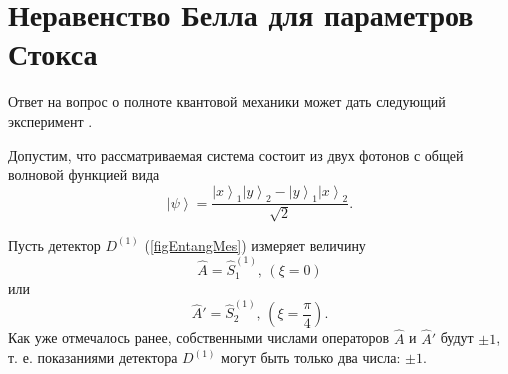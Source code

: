 \section{Неравенство Белла для параметров Стокса}
\label{pPart3EntangleBell}
Ответ на вопрос о полноте квантовой механики может дать следующий
эксперимент \cite{bBell, bPhisQuantInfo, PhysRevLett.28.938}.

Допустим, что рассматриваемая система состоит из двух фотонов с общей
волновой функцией вида
\begin{equation}
\left|\psi\right> = \frac{
\left|x\right>_1\left|y\right>_2 -
\left|y\right>_1\left|x\right>_2
}{\sqrt{2}}.
\label{eqBellInequalityState}
\end{equation}

Пусть детектор $D^{(1)}$ (\autoref{figEntangMes}) измеряет величину 
\[
\hat{A} = \hat{S}_1^{(1)}, \, (\xi = 0)
\] 
или
\[
\hat{A}' = \hat{S}_2^{(1)},\,(\xi =\frac{\pi}{4}).
\]
Как уже отмечалось ранее, собственными числами операторов $\hat{A}$ и
$\hat{A}'$ будут $\pm 1$, т. е. показаниями детектора $D^{(1)}$ могут
быть только два числа: $\pm 1$.

